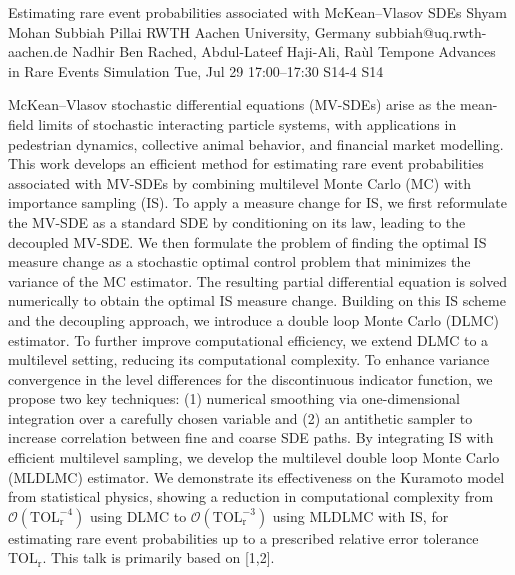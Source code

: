 \begin{talk}
  {Estimating rare event probabilities associated with McKean--Vlasov SDEs}%
  {Shyam Mohan Subbiah Pillai}%
  {RWTH Aachen University, Germany}%
  {subbiah@uq.rwth-aachen.de}%
  {Nadhir Ben Rached, Abdul-Lateef Haji-Ali, Ra\`ul Tempone}%
  {Advances in Rare Events Simulation}%
  {Tue, Jul 29 17:00--17:30}%
  {S14-4}%
  {S14}%
    
   
McKean--Vlasov stochastic differential equations (MV-SDEs) arise as the mean-field limits of stochastic interacting particle systems, with applications in pedestrian dynamics, collective animal behavior, and financial market modelling. This work develops an efficient method for estimating rare event probabilities associated with MV-SDEs by combining multilevel Monte Carlo (MC) with importance sampling (IS). To apply a measure change for IS, we first reformulate the MV-SDE as a standard SDE by conditioning on its law, leading to the decoupled MV-SDE. We then formulate the problem of finding the optimal IS measure change as a stochastic optimal control problem that minimizes the variance of the MC estimator. The resulting partial differential equation is solved numerically to obtain the optimal IS measure change. Building on this IS scheme and the decoupling approach, we introduce a double loop Monte Carlo (DLMC) estimator. To further improve computational efficiency, we extend DLMC to a multilevel setting, reducing its computational complexity. To enhance variance convergence in the level differences for the discontinuous indicator function, we propose two key techniques: (1) numerical smoothing via one-dimensional integration over a carefully chosen variable and (2) an antithetic sampler to increase correlation between fine and coarse SDE paths. By integrating IS with efficient multilevel sampling, we develop the multilevel double loop Monte Carlo (MLDLMC) estimator. We demonstrate its effectiveness on the Kuramoto model from statistical physics, showing a reduction in computational complexity from $\mathcal{O}(\mathrm{TOL}_\mathrm{r}^{-4})$ using DLMC to $\mathcal{O}(\mathrm{TOL}_\mathrm{r}^{-3})$ using MLDLMC with IS, for estimating rare event probabilities up to a prescribed relative error tolerance $\mathrm{TOL}_\mathrm{r}$. This talk is primarily based on [1,2].

\medskip


\end{talk}
